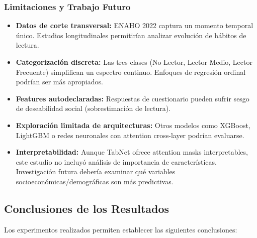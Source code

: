 \documentclass[12pt,a4paper]{article}
\begin{document}
\subsubsection{Limitaciones y Trabajo Futuro}

\begin{itemize}
    \item \textbf{Datos de corte transversal:} ENAHO 2022 captura un momento temporal único. Estudios longitudinales permitirían analizar evolución de hábitos de lectura.
    
    \item \textbf{Categorización discreta:} Las tres clases (No Lector, Lector Medio, Lector Frecuente) simplifican un espectro continuo. Enfoques de regresión ordinal podrían ser más apropiados.
    
    \item \textbf{Features autodeclaradas:} Respuestas de cuestionario pueden sufrir sesgo de deseabilidad social (sobrestimación de lectura).
    
    \item \textbf{Exploración limitada de arquitecturas:} Otros modelos como XGBoost, LightGBM o redes neuronales con attention cross-layer podrían evaluarse.
    
    \item \textbf{Interpretabilidad:} Aunque TabNet ofrece attention masks interpretables, este estudio no incluyó análisis de importancia de características. Investigación futura debería examinar qué variables socioeconómicas/demográficas son más predictivas.
\end{itemize}


\subsection{Conclusiones de los Resultados}

Los experimentos realizados permiten establecer las siguientes conclusiones:
\end{document}
